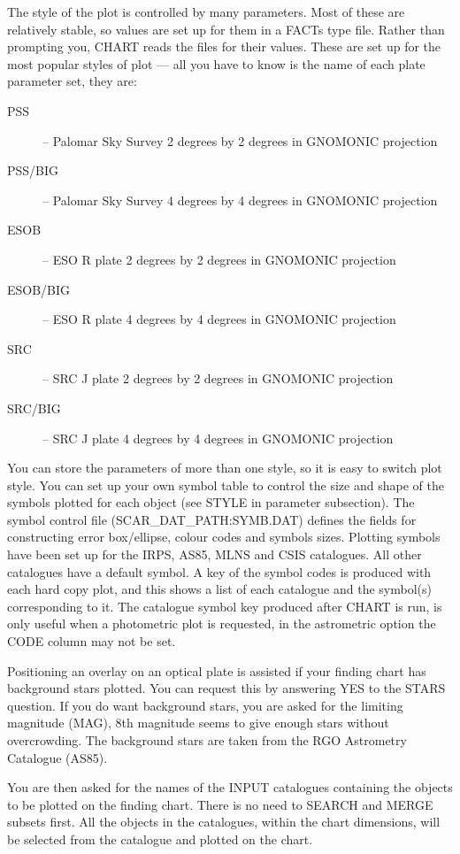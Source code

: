The style of the plot is controlled by many parameters.
Most of these are relatively stable, so values are set up for them in a FACTs
type file.
Rather than prompting you, CHART reads the files for their values.
These are set up for the most popular styles of plot --- all you have to know
is the name of each plate parameter set, they are:
\begin{description}
\item [PSS] -- Palomar Sky Survey 2 degrees by 2 degrees in GNOMONIC projection
\item [PSS/BIG] -- Palomar Sky Survey 4 degrees by 4 degrees in GNOMONIC
  projection
\item [ESOB] -- ESO R plate 2 degrees by 2 degrees in GNOMONIC projection
\item [ESOB/BIG] -- ESO R plate 4 degrees by 4 degrees in GNOMONIC projection
\item [SRC] -- SRC J plate 2 degrees by 2 degrees in GNOMONIC projection
\item [SRC/BIG] -- SRC J plate 4 degrees by 4 degrees in GNOMONIC projection
\end{description}
You can store the parameters of more than one style, so it is easy to switch
plot style.
You can set up your own symbol table to control the size and shape of the
symbols plotted for each object (see STYLE in parameter subsection).
The symbol control file (SCAR\_DAT\_PATH:SYMB.DAT) defines the fields for
constructing error box/ellipse, colour codes and symbols sizes.
Plotting symbols have been set up for the IRPS, AS85, MLNS and CSIS
catalogues.
All other catalogues have a default symbol.
A key of the symbol codes is produced with each hard copy plot, and this shows
a list of each catalogue and the symbol(s) corresponding to it.
The catalogue symbol key produced after CHART is run, is only useful when a
photometric plot is requested, in the astrometric option the CODE
column may not be set.

Positioning an overlay on an optical plate is assisted if your
finding chart has background stars plotted.
You can request this by answering YES to the STARS question.
If you do want background stars, you are asked for the limiting magnitude
(MAG), 8th magnitude seems to give enough stars without overcrowding.
The background stars are taken from the RGO Astrometry Catalogue (AS85).

You are then asked for the names of the INPUT catalogues containing
the objects to be plotted on the finding chart.
There is no need to SEARCH and MERGE subsets first.
All the objects in the catalogues, within the chart dimensions, will be
selected from the catalogue and plotted on the chart.

